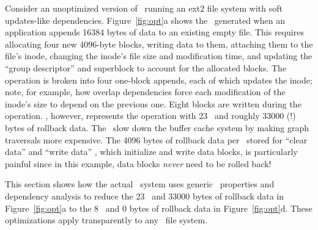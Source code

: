 Consider an unoptimized version of \Kudos\ running an ext2 file system with
soft updates-like dependencies.
%
Figure~\ref{fig:opt}a shows the \patches\ generated when an application appends
16384 bytes of data to an existing empty file.
%
This requires allocating four new 4096-byte blocks, writing data to them,
attaching them to the file's inode, changing the inode's file size and
modification time, and updating the ``group descriptor'' and superblock to
account for the allocated blocks.
%
The operation is broken into four one-block appends, each of which updates
the inode; note, for example, how overlap dependencies force each
modification of the inode's size to depend on the previous one.
%
Eight blocks are written during the operation.
%
\Kudos, however, represents the operation with 23 \patches\ and roughly 33000
(!) bytes of rollback data.
%
The \patches\ slow down the buffer cache system by making graph traversals
more expensive.
%
The 4096 bytes of rollback data per \patch\ stored for ``clear data'' and
``write data'' \patches, which initialize and write data blocks, is
particularly painful since in this example, data blocks \emph{never}
need to be rolled back!


This section shows how the actual \Kudos\ system uses generic \patch\
properties and dependency analysis to reduce the 23 \patches\ and 33000 bytes
of rollback data in Figure~\ref{fig:opt}a to the 8 \patches\ and 0 bytes of
rollback data in Figure~\ref{fig:opt}d.
%
These optimizations apply transparently to any \Kudos\ file system.


